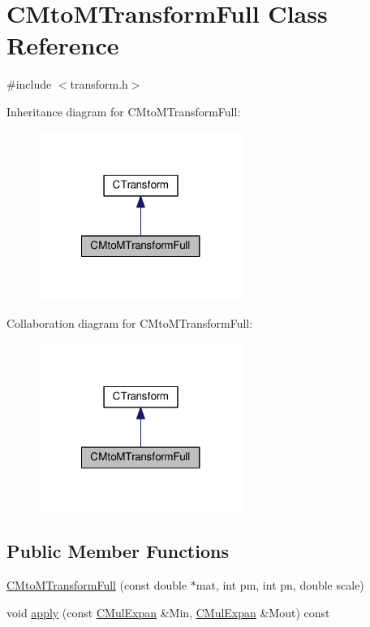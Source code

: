 \hypertarget{classCMtoMTransformFull}{\section{C\-Mto\-M\-Transform\-Full Class Reference}
\label{classCMtoMTransformFull}
}


{\ttfamily \#include $<$transform.\-h$>$}



Inheritance diagram for C\-Mto\-M\-Transform\-Full\-:\nopagebreak
\begin{figure}[H]
\begin{center}
\leavevmode
\includegraphics[width=188pt]{classCMtoMTransformFull__inherit__graph}
\end{center}
\end{figure}


Collaboration diagram for C\-Mto\-M\-Transform\-Full\-:\nopagebreak
\begin{figure}[H]
\begin{center}
\leavevmode
\includegraphics[width=188pt]{classCMtoMTransformFull__coll__graph}
\end{center}
\end{figure}
\subsection*{Public Member Functions}
\begin{DoxyCompactItemize}
\item 
\hyperlink{classCMtoMTransformFull_a153149877b790867c17e7a1ad7d64747}{C\-Mto\-M\-Transform\-Full} (const double $\ast$mat, int pm, int pn, double scale)
\item 
void \hyperlink{classCMtoMTransformFull_a188edd638a34bc0228eb8197145c288a}{apply} (const \hyperlink{classCMulExpan}{C\-Mul\-Expan} \&Min, \hyperlink{classCMulExpan}{C\-Mul\-Expan} \&Mout) const 
\end{DoxyCompactItemize}
